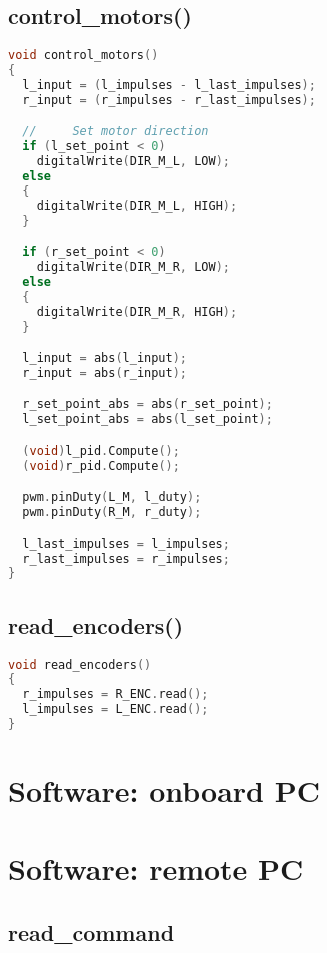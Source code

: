 \subsection{control\_motors()}

\begin{lstlisting}[language=C]
void control_motors()
{
  l_input = (l_impulses - l_last_impulses);
  r_input = (r_impulses - r_last_impulses);

  //     Set motor direction
  if (l_set_point < 0)
    digitalWrite(DIR_M_L, LOW);
  else
  {
    digitalWrite(DIR_M_L, HIGH);
  }

  if (r_set_point < 0)
    digitalWrite(DIR_M_R, LOW);
  else
  {
    digitalWrite(DIR_M_R, HIGH);
  }

  l_input = abs(l_input);
  r_input = abs(r_input);

  r_set_point_abs = abs(r_set_point);
  l_set_point_abs = abs(l_set_point);

  (void)l_pid.Compute();
  (void)r_pid.Compute();

  pwm.pinDuty(L_M, l_duty);
  pwm.pinDuty(R_M, r_duty);

  l_last_impulses = l_impulses;
  r_last_impulses = r_impulses;
}
\end{lstlisting}

\subsection{read\_encoders()}

\begin{lstlisting}[language=C]
void read_encoders()
{
  r_impulses = R_ENC.read();
  l_impulses = L_ENC.read();
}
\end{lstlisting}


\section{Software: onboard PC}

\section{Software: remote PC}

\subsection{read\_command}

\begin{lstlisting}[language=C]
\end{lstlisting}

\begin{lstlisting}[language=C]
\end{lstlisting}